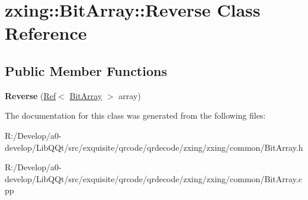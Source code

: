 \hypertarget{classzxing_1_1_bit_array_1_1_reverse}{}\section{zxing\+:\+:Bit\+Array\+:\+:Reverse Class Reference}
\label{classzxing_1_1_bit_array_1_1_reverse}
\subsection*{Public Member Functions}
\begin{DoxyCompactItemize}
\item 
\mbox{\label{classzxing_1_1_bit_array_1_1_reverse_a0ba455c7e026e5b05c8d4a2a2c902a7b}} 
{\bfseries Reverse} (\mbox{\hyperlink{classzxing_1_1_ref}{Ref}}$<$ \mbox{\hyperlink{classzxing_1_1_bit_array}{Bit\+Array}} $>$ array)
\end{DoxyCompactItemize}


The documentation for this class was generated from the following files\+:\begin{DoxyCompactItemize}
\item 
R\+:/\+Develop/a0-\/develop/\+Lib\+Q\+Qt/src/exquisite/qrcode/qrdecode/zxing/zxing/common/Bit\+Array.\+h\item 
R\+:/\+Develop/a0-\/develop/\+Lib\+Q\+Qt/src/exquisite/qrcode/qrdecode/zxing/zxing/common/Bit\+Array.\+cpp\end{DoxyCompactItemize}
